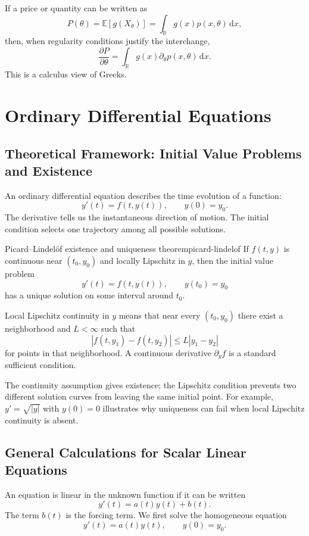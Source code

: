 \documentclass[11pt]{article}
\newcommand{\R}{\mathbb{R}}
\newcommand{\E}{\mathbb{E}}
\newcommand{\dd}{\,\mathrm{d}}
\theoremstyle{definition}
\theoremstyle{plain}
\theoremstyle{remark}
\begin{document}
If a price or quantity can be written as
\[
P(\theta)=\E[g(X_\theta)]
=\int_\R g(x)p(x,\theta)\dd x,
\]
then, when regularity conditions justify the interchange,
\[
\frac{\partial P}{\partial\theta}
=
\int_\R g(x)\partial_\theta p(x,\theta)\dd x.
\]
This is a calculus view of Greeks.

\section{Ordinary Differential Equations}

\subsection{Theoretical Framework: Initial Value Problems and Existence}

An ordinary differential equation describes the time evolution of a function:
\[
y'(t)=f(t,y(t)),
\qquad y(0)=y_0.
\]
The derivative tells us the instantaneous direction of motion. The initial
condition selects one trajectory among all possible solutions.

\begin{keyproposition}{Picard--Lindelöf existence and uniqueness theorem}{picard-lindelof}
If $f(t,y)$ is continuous near $(t_0,y_0)$ and locally Lipschitz in $y$, then
the initial value problem
\[
\boxed{y'(t)=f(t,y(t)),\qquad y(t_0)=y_0}
\]
has a unique solution on some interval around $t_0$.
\end{keyproposition}

Local Lipschitz continuity in $y$ means that near every $(t_0,y_0)$ there
exist a neighborhood and $L<\infty$ such that
\[
|f(t,y_1)-f(t,y_2)|\leq L|y_1-y_2|
\]
for points in that neighborhood. A continuous derivative $\partial_yf$ is a
standard sufficient condition.

The continuity assumption gives existence; the Lipschitz condition prevents
two different solution curves from leaving the same initial point. For
example, $y'=\sqrt{|y|}$ with $y(0)=0$ illustrates why uniqueness can fail
when local Lipschitz continuity is absent.

\subsection{General Calculations for Scalar Linear Equations}

An equation is linear in the unknown function if it can be written
\[
y'(t)=a(t)y(t)+b(t).
\]
The term $b(t)$ is the forcing term. We first solve the homogeneous equation
\[
y'(t)=a(t)y(t),
\qquad y(0)=y_0.
\]
\end{document}
